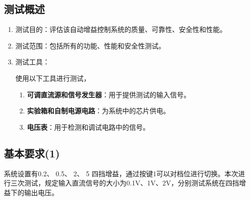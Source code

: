 \documentclass[lang=cn,11pt,a4paper]{elegantpaper}
\begin{document}
\subsection{测试概述}
\begin{enumerate}
  \item 测试目的：评估该自动增益控制系统的质量、可靠性、安全性和性能。

  \item 测试范围：包括所有的功能、性能和安全性测试。

  \item 测试工具：

        使用以下工具进行测试，
        \begin{enumerate}
          \item \textbf{可调直流源和信号发生器}：用于提供测试的输入信号。
          \item \textbf{实验箱和自制电源电路}：为系统中的芯片供电。
          \item \textbf{电压表}：用于检测和调试电路中的信号。
        \end{enumerate}

\end{enumerate}

\subsection{基本要求(1)}
系统设置有0.2、 0.5、 2、 5 四挡增益，通过按键1可以对档位进行切换。本次进行三次测试，规定输入直流信号的大小为0.1V、1V、2V，分别测试系统在四挡增益下的输出电压。
\end{document}
